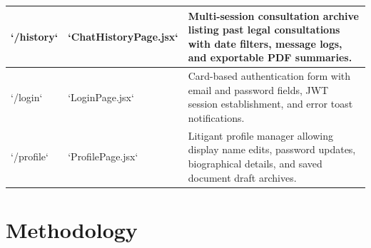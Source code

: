 \begin{table}[H]
\begin{tabularx}{\textwidth}{lp{3.2cm}X}
\midrule
`/history` & `ChatHistoryPage.jsx` & Multi-session consultation archive listing past legal consultations with date filters, message logs, and exportable PDF summaries. \\
\midrule
`/login` & `LoginPage.jsx` & Card-based authentication form with email and password fields, JWT session establishment, and error toast notifications. \\
\midrule
`/profile` & `ProfilePage.jsx` & Litigant profile manager allowing display name edits, password updates, biographical details, and saved document draft archives. \\
\bottomrule
\end{tabularx}
\end{table}

\section{Methodology}
\label{sec:methodology}

